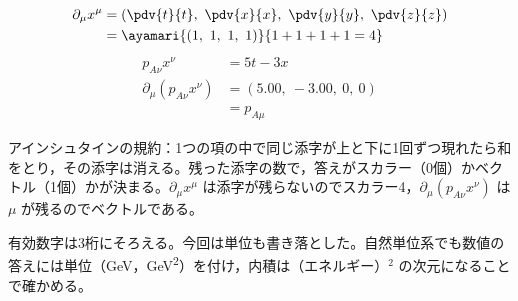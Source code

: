\begin{align*}
  \partial_{\mu}x^{\mu}&=\left(\pdv{t}{t},\ \pdv{x}{x},\ \pdv{y}{y},\ \pdv{z}{z}\right)\\
  &=\ayamari{(1,\ 1,\ 1,\ 1)}{1+1+1+1=4}
\end{align*}
\begin{align*}
  p_{A\nu}x^{\nu}&=5t-3x\\
  \partial_{\mu}(p_{A\nu}x^{\nu})&=(5.00,\ -3.00,\ 0,\ 0)\\
  &=p_{A\mu}
\end{align*}
\item アインシュタインの規約：1つの項の中で同じ添字が上と下に1回ずつ現れたら和をとり，その添字は消える。残った添字の数で，答えがスカラー（0個）かベクトル（1個）かが決まる。$\partial_{\mu}x^{\mu}$ は添字が残らないのでスカラー4，$\partial_{\mu}(p_{A\nu}x^{\nu})$ は $\mu$ が残るのでベクトルである。
\item {} 有効数字は3桁にそろえる。今回は単位も書き落とした。自然単位系でも数値の答えには単位（\unit{\giga\electronvolt}，\unit{\giga\electronvolt\squared}）を付け，内積は（エネルギー）$^{2}$ の次元になることで確かめる。
